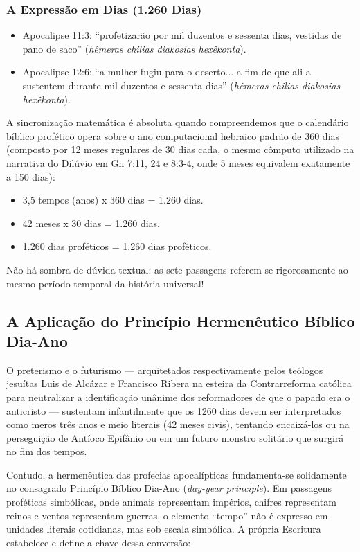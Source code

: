 \documentclass[11pt,a4paper,openany]{book}
\begin{document}
\subsubsection*{A Expressão em Dias (1.260 Dias)}
\begin{itemize}
  \item Apocalipse 11:3: ``profetizarão por mil duzentos e sessenta dias, vestidas de pano de saco'' (\textit{hêmeras chilias diakosias hexêkonta}).
  \item Apocalipse 12:6: ``a mulher fugiu para o deserto... a fim de que ali a sustentem durante mil duzentos e sessenta dias'' (\textit{hêmeras chilias diakosias hexêkonta}).
\end{itemize}


A sincronização matemática é absoluta quando compreendemos que o calendário bíblico profético opera sobre o ano computacional hebraico padrão de 360 dias (composto por 12 meses regulares de 30 dias cada, o mesmo cômputo utilizado na narrativa do Dilúvio em Gn 7:11, 24 e 8:3-4, onde 5 meses equivalem exatamente a 150 dias):
\begin{itemize}
  \item 3,5 tempos (anos) x 360 dias = 1.260 dias.
  \item 42 meses x 30 dias = 1.260 dias.
  \item 1.260 dias proféticos = 1.260 dias proféticos.
\end{itemize}


Não há sombra de dúvida textual: as sete passagens referem-se rigorosamente ao mesmo período temporal da história universal!



\subsection{A Aplicação do Princípio Hermenêutico Bíblico Dia-Ano}


O preterismo e o futurismo — arquitetados respectivamente pelos teólogos jesuítas Luis de Alcázar e Francisco Ribera na esteira da Contrarreforma católica para neutralizar a identificação unânime dos reformadores de que o papado era o anticristo — sustentam infantilmente que os 1260 dias devem ser interpretados como meros três anos e meio literais (42 meses civis), tentando encaixá-los ou na perseguição de Antíoco Epifânio ou em um futuro monstro solitário que surgirá no fim dos tempos.

Contudo, a hermenêutica das profecias apocalípticas fundamenta-se solidamente no consagrado Princípio Bíblico Dia-Ano (\textit{day-year principle}). Em passagens proféticas simbólicas, onde animais representam impérios, chifres representam reinos e ventos representam guerras, o elemento ``tempo'' não é expresso em unidades literais cotidianas, mas sob escala simbólica. A própria Escritura estabelece e define a chave dessa conversão:
\end{document}
